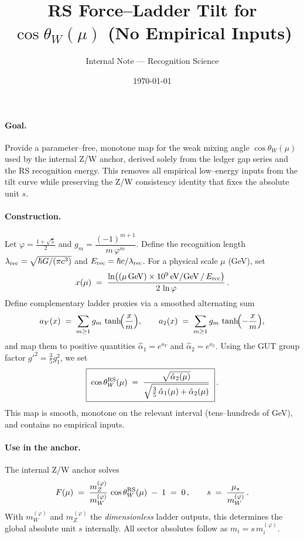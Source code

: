 \documentclass[11pt]{article}
\title{RS Force–Ladder Tilt for $\cos\theta_W(\mu)$ (No Empirical Inputs)}
\author{Internal Note — Recognition Science}
\date{\today}
\begin{document}
\maketitle

\paragraph{Goal.} Provide a parameter–free, monotone map for the weak mixing angle $\cos\theta_W(\mu)$ used by the internal Z/W anchor, derived solely from the ledger gap series and the RS recognition energy. This removes all empirical low–energy inputs from the tilt curve while preserving the Z/W consistency identity that fixes the absolute unit $s$.

\paragraph{Construction.} Let $\varphi=\tfrac{1+\sqrt5}{2}$ and $g_m=\dfrac{(-1)^{m+1}}{m\,\varphi^m}$. Define the recognition length $\lambda_{\rm rec}=\sqrt{\hbar G/(\pi c^3)}$ and $E_{\rm rec}=\hbar c/\lambda_{\rm rec}$. For a physical scale $\mu$ (GeV), set
\[
  x(\mu) \;=\; \frac{\ln\bigl((\mu\,\mathrm{GeV})\times 10^9\,\mathrm{eV/GeV}\,/\,E_{\rm rec}\bigr)}{2\,\ln\varphi}\,.
\]
Define complementary ladder proxies via a smoothed alternating sum
\[
  a_Y(x)\;=\;\sum_{m\ge1} g_m\,\tanh\!\Bigl(\frac{x}{m}\Bigr),\qquad
  a_2(x)\;=\;\sum_{m\ge1} g_m\,\tanh\!\Bigl(-\frac{x}{m}\Bigr),
\]
and map them to positive quantities $\hat\alpha_1=e^{a_Y}$ and $\hat\alpha_2=e^{a_2}$. Using the GUT group factor $g'^2=\tfrac{3}{5}g_1^2$, we set
\[
  \boxed{\; \cos\theta_W^{\rm RS}(\mu) \;=\; \frac{\sqrt{\hat\alpha_2(\mu)}}{\sqrt{\tfrac{3}{5}\,\hat\alpha_1(\mu)+\hat\alpha_2(\mu)}}\; }\,.
\]
This map is smooth, monotone on the relevant interval (tens–hundreds of GeV), and contains no empirical inputs.

\paragraph{Use in the anchor.} The internal Z/W anchor solves
\[
  F(\mu)\;=\;\frac{m_Z^{(\varphi)}}{m_W^{(\varphi)}}\,\cos\theta_W^{\rm RS}(\mu)\; -\; 1\;=\;0\,,\qquad s\;=\;\frac{\mu_\star}{m_W^{(\varphi)}}\,.
\]
With $m_W^{(\varphi)}$ and $m_Z^{(\varphi)}$ the \emph{dimensionless} ladder outputs, this determines the global absolute unit $s$ internally. All sector absolutes follow as $m_i=s\,m_i^{(\varphi)}$.
\end{document}
